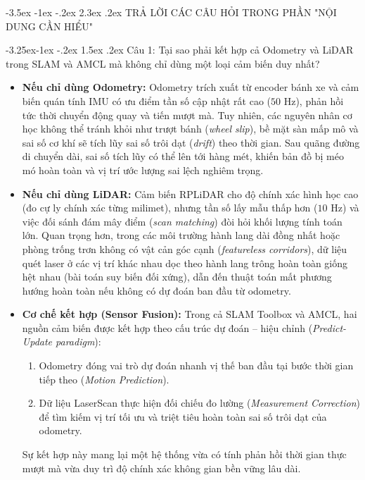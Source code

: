 \documentclass[11pt,a4paper]{article}
\makeatletter
\renewcommand{\section}{\@startsection{section}{1}{\z@}%
  {-3.5ex \@plus -1ex \@minus -.2ex}%
  {2.3ex \@plus.2ex}%
  {\normalfont\Large\bfseries\color{primary}}}
\renewcommand{\subsection}{\@startsection{subsection}{2}{\z@}%
  {-3.25ex\@plus -1ex \@minus -.2ex}%
  {1.5ex \@plus .2ex}%
  {\normalfont\large\bfseries\color{secondary}}}
\makeatother
\begin{document}
\newpage
\section{TRẢ LỜI CÁC CÂU HỎI TRONG PHẦN "NỘI DUNG CẦN HIỂU"}

\subsection{Câu 1: Tại sao phải kết hợp cả Odometry và LiDAR trong SLAM và AMCL mà không chỉ dùng một loại cảm biến duy nhất?}
\begin{itemize}
  \item \textbf{Nếu chỉ dùng Odometry:} Odometry trích xuất từ encoder bánh xe và cảm biến quán tính IMU có ưu điểm tần số cập nhật rất cao ($50\text{ Hz}$), phản hồi tức thời chuyển động quay và tiến mượt mà. Tuy nhiên, các nguyên nhân cơ học không thể tránh khỏi như trượt bánh (\textit{wheel slip}), bề mặt sàn mấp mô và sai số cơ khí sẽ tích lũy sai số trôi dạt (\textit{drift}) theo thời gian. Sau quãng đường di chuyển dài, sai số tích lũy có thể lên tới hàng mét, khiến bản đồ bị méo mó hoàn toàn và vị trí ước lượng sai lệch nghiêm trọng.
  \item \textbf{Nếu chỉ dùng LiDAR:} Cảm biến RPLiDAR cho độ chính xác hình học cao (đo cự ly chính xác từng milimet), nhưng tần số lấy mẫu thấp hơn ($10\text{ Hz}$) và việc đối sánh đám mây điểm (\textit{scan matching}) đòi hỏi khối lượng tính toán lớn. Quan trọng hơn, trong các môi trường hành lang dài đồng nhất hoặc phòng trống trơn không có vật cản góc cạnh (\textit{featureless corridors}), dữ liệu quét laser ở các vị trí khác nhau dọc theo hành lang trông hoàn toàn giống hệt nhau (bài toán suy biến đối xứng), dẫn đến thuật toán mất phương hướng hoàn toàn nếu không có dự đoán ban đầu từ odometry.
  \item \textbf{Cơ chế kết hợp (Sensor Fusion):} Trong cả SLAM Toolbox và AMCL, hai nguồn cảm biến được kết hợp theo cấu trúc dự đoán -- hiệu chỉnh (\textit{Predict-Update paradigm}):
  \begin{enumerate}
    \item Odometry đóng vai trò dự đoán nhanh vị thế ban đầu tại bước thời gian tiếp theo (\textit{Motion Prediction}).
    \item Dữ liệu LaserScan thực hiện đối chiếu đo lường (\textit{Measurement Correction}) để tìm kiếm vị trí tối ưu và triệt tiêu hoàn toàn sai số trôi dạt của odometry.
  \end{enumerate}
  Sự kết hợp này mang lại một hệ thống vừa có tính phản hồi thời gian thực mượt mà vừa duy trì độ chính xác không gian bền vững lâu dài.
\end{itemize}
\end{document}
